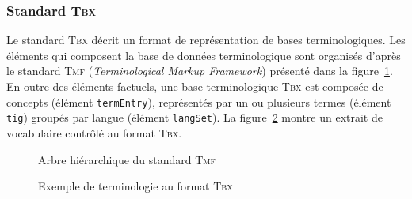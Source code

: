       \subsubsection{Standard \textsc{Tbx}}
      \label{subsubsec:main-automatic_evaluation_of_keyphrase_annotation-methodology-data_format-tbx}
        Le standard \textsc{Tbx} décrit un format de représentation de bases
        terminologiques. Les éléments qui composent la base de données
        terminologique sont organisés d'après le standard \textsc{Tmf}
        (\textit{Terminological Markup Framework}) présenté dans la
        figure~\ref{fig:tmf}. En outre des éléments
        factuels, une base terminologique \textsc{Tbx} est composée de concepts
        (élément \texttt{termEntry}), représentés par un ou plusieurs termes
        (élément \texttt{tig}) groupés par langue (élément \texttt{langSet}).
        La figure~\ref{fig:tbx_example} montre un extrait de vocabulaire
        contrôlé au format \textsc{Tbx}.
        \begin{figure}
          \centering
          \caption{Arbre hiérarchique du standard \textsc{Tmf}
                   \label{fig:tmf}}
        \end{figure}
        \begin{figure}[h!]
          \lstset{language=XML}
          \lstset{frame=single}
          
          \caption{Exemple de terminologie au format \textsc{Tbx}
                   \label{fig:tbx_example}}
        \end{figure}

